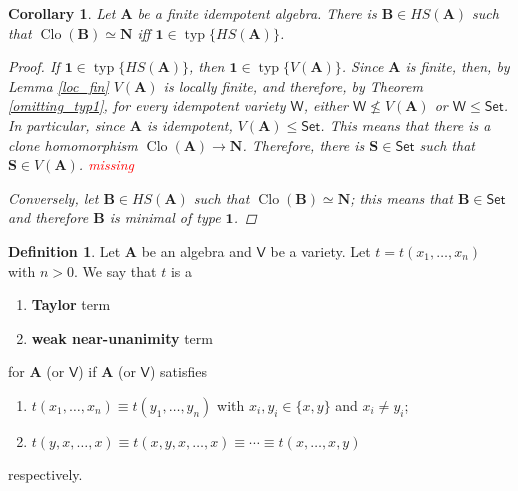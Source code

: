 \documentclass{amsart}
\theoremstyle{plain}
\newtheorem{corollary}[theorem]{Corollary}
\theoremstyle{definition}
\newtheorem{definition}[theorem]{Definition}
\theoremstyle{remark}
\DeclareMathOperator{\Clo}{Clo}
\DeclareMathOperator{\typ}{typ}
\begin{document}
\begin{corollary}
    Let $\mathbf{A}$ be a finite idempotent algebra. 
    There is $\mathbf{B} \in HS(\mathbf{A})$ such that $\Clo(\mathbf{B}) \simeq \mathbf{N}$ iff $\mathbf{1} \in \typ\{HS(\mathbf{A})\}$. 
    \begin{proof}
        If $\mathbf{1} \in \typ\{HS(\mathbf{A})\}$, then $\mathbf{1} \in \typ\{V(\mathbf{A})\}$. 
        Since $\mathbf{A}$ is finite, then, by Lemma \ref{loc_fin} $V(\mathbf{A})$ is locally finite, 
        and therefore, by Theorem \ref{omitting_typ1}, for every idempotent variety $\mathsf{W}$, either $\mathsf{W} \nleq V(\mathbf{A})$ or $\mathsf{W} \le \mathsf{Set}$. 
        In particular, since $\mathbf{A}$ is idempotent, $V(\mathbf{A}) \le \mathsf{Set}$. 
        This means that there is a clone homomorphism $\Clo(\mathbf{A}) \to \mathbf{N}$. 
        Therefore, there is $\mathbf{S} \in \mathsf{Set}$ such that $\mathbf{S} \in V(\mathbf{A})$. 
        \textcolor{red}{missing}

        Conversely, let $\mathbf{B} \in HS(\mathbf{A})$ such that $\Clo(\mathbf{B}) \simeq \mathbf{N}$; 
        this means that $\mathbf{B} \in \mathsf{Set}$ and therefore $\mathbf{B}$ is minimal of type $\mathbf{1}$. 
    \end{proof}
\end{corollary}

\begin{definition}
    Let $\mathbf{A}$ be an algebra and $\mathsf{V}$ be a variety. 
    Let $t=t(x_1, \ldots, x_n)$ with $n >0$.
    We say that $t$ is a
    \begin{enumerate}
        \item \textbf{Taylor} term 
        \item \textbf{weak near-unanimity} term 
    \end{enumerate}
    for $\mathbf{A}$ (or $\mathsf{V}$) if $\mathbf{A}$ (or $\mathsf{V}$) satisfies 
    \begin{enumerate}
        \item $t(x_1, \ldots, x_n) \equiv t(y_1, \ldots, y_n)$ with $x_i, y_i \in \{x,y\}$ and $x_i \neq y_i$;
        \item $t(y, x, \ldots, x) \equiv t(x,y,x,\ldots, x) \equiv \cdots \equiv t(x, \ldots, x,y)$
    \end{enumerate}
    respectively. 
\end{definition}
\end{document}
